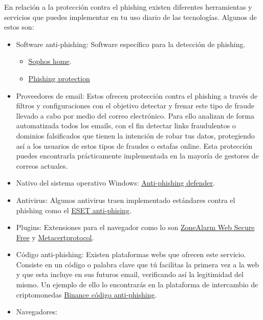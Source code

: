 \documentclass[
  a4paper,
  openany]{book}
\begin{document}
En relación a la protección contra el phishing existen diferentes herramientas y servicios que puedes implementar en tu uso diario de las tecnologías. Algunos de estos son:

\begin{itemize}
\item
  Software anti-phishing: Software específico para la detección de phishing.

  \begin{itemize}
  \item
    \href{https://home.sophos.com/es-es.aspx}{Sophos home}.
  \item
    \href{https://www.phishprotection.com/}{Phishing protection}
  \end{itemize}
\item
  Proveedores de email: Estos ofrecen protección contra el phishing a través de filtros y configuraciones con el objetivo detectar y frenar este tipo de fraude llevado a cabo por medio del correo electrónico. Para ello analizan de forma automatizada todos los emails, con el fin detectar links fraudulentos o dominios falsificados que tienen la intención de robar tus datos, protegiendo así a los usuarios de estos tipos de fraudes o estafas online. Esta protección puedes encontrarla prácticamente implementada en la mayoría de gestores de correos actuales.
\item
  Nativo del sistema operativo Windows: \href{https://docs.microsoft.com/es-es/office365/servicedescriptions/office-365-advanced-threat-protection-service-description}{Anti-phishing defender}.
\item
  Antivirus: Algunos antivirus traen implementado estándares contra el phishing como el \href{https://support.eset.com/es/kb6380-activar-anti-phishing-en-productos-para-android-de-eset\#enable}{ESET anti-phising}.
\item
  Plugins: Extensiones para el navegador como lo son \href{https://www.zonealarm.com/es/software/web-secure-free}{ZoneAlarm Web Secure Free} y \href{https://metacertprotocol.com/cryptonite}{Metacertprotocol}.
\item
  Código anti-phishing: Existen plataformas webs que ofrecen este servicio. Consiste en un código o palabra clave que tú facilitas la primera vez a la web y que esta incluye en sus futuros email, verificando así la legitimidad del mismo. Un ejemplo de ello lo encontrarás en la plataforma de intercambio de criptomonedas \href{https://academy.binance.com/es/articles/anti-phishing-code}{Binance código anti-phishing}.
\item
  Navegadores:


\end{itemize}
\end{document}
